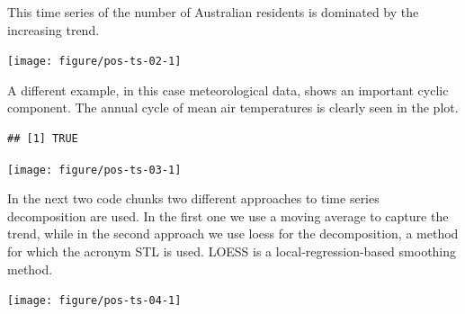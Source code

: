 \documentclass[krantz2]{krantz}\usepackage{knitr}%
\begin{document}
This time series of the number of Australian residents is dominated by the increasing trend.

\begin{knitrout}\footnotesize
{}\color{fgcolor}\begin{kframe}
\begin{alltt}
\end{alltt}
\end{kframe}

{\centering \texttt{[image: figure/pos-ts-02-1]} 

}



\end{knitrout}

A different example, in this case meteorological data, shows an important cyclic component. The annual cycle of mean air temperatures is clearly seen in the plot.

\begin{knitrout}\footnotesize
{}\color{fgcolor}\begin{kframe}
\begin{alltt}
\end{alltt}
\begin{verbatim}
## [1] TRUE
\end{verbatim}
\begin{alltt}
\end{alltt}
\end{kframe}

{\centering \texttt{[image: figure/pos-ts-03-1]} 

}



\end{knitrout}

In the next two code chunks two different approaches to time series decomposition are used. In the first one we use a moving average to capture the trend, while in the second approach we use loess for the decomposition, a method for which the acronym STL is used. LOESS is a local-regression-based smoothing method.

\begin{knitrout}\footnotesize
{}\color{fgcolor}\begin{kframe}
\begin{alltt}
 \hlkwb{<-}  \hlopt{-} \hlstd{)} \hlopt{*} \hlopt{/}
 \hlkwb{<-} 
\end{alltt}
\end{kframe}

{\centering \texttt{[image: figure/pos-ts-04-1]} 

}



\end{knitrout}
\end{document}
